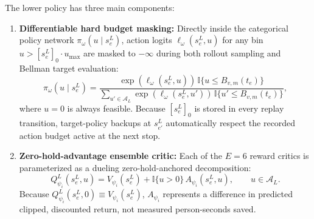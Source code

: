 The lower policy has three main components:
\begin{enumerate}
  \item \textbf{Differentiable hard budget masking:} Directly inside the categorical policy network $\pi_\omega(u \mid s^L_e)$, action logits $\ell_\omega(s^L_e, u)$ for any bin $u > [s^L_e]_0 \cdot u_{\max}$ are masked to $-\infty$ during both rollout sampling and Bellman target evaluation:
  \begin{equation}
    \pi_\omega(u \mid s^L_e) = \frac{\exp(\ell_\omega(s^L_e, u))\,\mathbb{I}\{u \le B_{v,m}(t_e)\}}{\sum_{u' \in \mathcal{A}_L} \exp(\ell_\omega(s^L_e, u'))\,\mathbb{I}\{u' \le B_{v,m}(t_e)\}},
    \label{eq:hard_action_mask}
  \end{equation}
  where $u = 0$ is always feasible. Because $[s^L_e]_0$ is stored in every replay transition, target-policy backups at $s^L_{e'}$ automatically respect the recorded action budget active at the next stop.

  \item \textbf{Zero-hold-advantage ensemble critic:} Each of the $E = 6$ reward critics is parameterized as a dueling zero-hold-anchored decomposition:
  \begin{equation}
    Q^L_{\psi_i}(s^L_e, u) = V_{\psi_i}(s^L_e) + \mathbb{I}\{u > 0\}\,A_{\psi_i}(s^L_e, u), \qquad u \in \mathcal{A}_L.
    \label{eq:zero_hold_advantage}
  \end{equation}
Because $Q^L_{\psi_i}(s^L_e,0)\equiv V_{\psi_i}(s^L_e)$, $A_{\psi_i}$ represents a difference in predicted clipped, discounted return, not measured person-seconds saved.


\end{enumerate}
